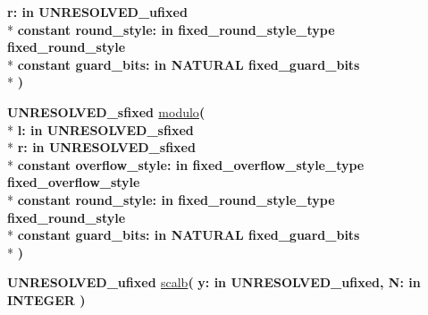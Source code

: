 \begin{DoxyCompactItemize}
{\bfseries \textcolor{vhdlchar}{r\+: }\textcolor{stringliteral}{in }\textcolor{vhdlchar}{U\+N\+R\+E\+S\+O\+L\+V\+E\+D\+\_\+ufixed}}\\*
{\bfseries {\bfseries \textcolor{keywordflow}{constant}\textcolor{vhdlchar}{ }}\textcolor{vhdlchar}{round\+\_\+style\+: }\textcolor{stringliteral}{in }\textcolor{vhdlchar}{fixed\+\_\+round\+\_\+style\+\_\+type     fixed\+\_\+round\+\_\+style}}\\*
{\bfseries {\bfseries \textcolor{keywordflow}{constant}\textcolor{vhdlchar}{ }}\textcolor{vhdlchar}{guard\+\_\+bits\+: }\textcolor{stringliteral}{in }\textcolor{vhdlchar}{N\+A\+T\+U\+R\+A\+L     fixed\+\_\+guard\+\_\+bits}}\\*
{\bfseries  )} 
\item 
{\bfseries {\bfseries \textcolor{vhdlchar}{U\+N\+R\+E\+S\+O\+L\+V\+E\+D\+\_\+sfixed}\textcolor{vhdlchar}{ }}} \hyperlink{class__fixed__pkg_a9f561bf3a259253d79b62c44114986d1}{modulo}{\bfseries  ( }\\*
{\bfseries \textcolor{vhdlchar}{l\+: }\textcolor{stringliteral}{in }\textcolor{vhdlchar}{U\+N\+R\+E\+S\+O\+L\+V\+E\+D\+\_\+sfixed}}\\*
{\bfseries \textcolor{vhdlchar}{r\+: }\textcolor{stringliteral}{in }\textcolor{vhdlchar}{U\+N\+R\+E\+S\+O\+L\+V\+E\+D\+\_\+sfixed}}\\*
{\bfseries {\bfseries \textcolor{keywordflow}{constant}\textcolor{vhdlchar}{ }}\textcolor{vhdlchar}{overflow\+\_\+style\+: }\textcolor{stringliteral}{in }\textcolor{vhdlchar}{fixed\+\_\+overflow\+\_\+style\+\_\+type     fixed\+\_\+overflow\+\_\+style}}\\*
{\bfseries {\bfseries \textcolor{keywordflow}{constant}\textcolor{vhdlchar}{ }}\textcolor{vhdlchar}{round\+\_\+style\+: }\textcolor{stringliteral}{in }\textcolor{vhdlchar}{fixed\+\_\+round\+\_\+style\+\_\+type     fixed\+\_\+round\+\_\+style}}\\*
{\bfseries {\bfseries \textcolor{keywordflow}{constant}\textcolor{vhdlchar}{ }}\textcolor{vhdlchar}{guard\+\_\+bits\+: }\textcolor{stringliteral}{in }\textcolor{vhdlchar}{N\+A\+T\+U\+R\+A\+L     fixed\+\_\+guard\+\_\+bits}}\\*
{\bfseries  )} 
\item 
{\bfseries {\bfseries \textcolor{vhdlchar}{U\+N\+R\+E\+S\+O\+L\+V\+E\+D\+\_\+ufixed}\textcolor{vhdlchar}{ }}} \hyperlink{class__fixed__pkg_a991487fdeca1541f633acc7ebb85598b}{scalb}{\bfseries  ( }{\bfseries \textcolor{vhdlchar}{y\+: }\textcolor{stringliteral}{in }\textcolor{vhdlchar}{U\+N\+R\+E\+S\+O\+L\+V\+E\+D\+\_\+ufixed}}{\bfseries  , \textcolor{vhdlchar}{N\+: }\textcolor{stringliteral}{in }{\bfseries \textcolor{comment}{I\+N\+T\+E\+G\+E\+R}\textcolor{vhdlchar}{ }}}{\bfseries  )} 

\end{DoxyCompactItemize}

